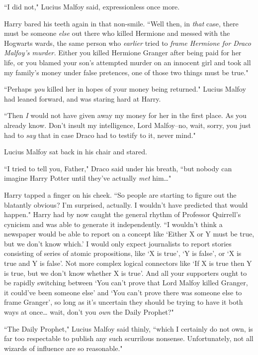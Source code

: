 ``I did not," Lucius Malfoy said, expressionless once more.

Harry bared his teeth again in that non-smile. ``Well then, in \emph{that} case, there must be someone \emph{else} out there who killed Hermione and messed with the Hogwarts wards, the same person who \emph{earlier} tried to \emph{frame Hermione for Draco Malfoy's murder.} Either you killed Hermione Granger after being paid for her life, or you blamed your son's attempted murder on an innocent girl and took all my family's money under false pretences, one of those two things must be true."

``Perhaps \emph{you} killed her in hopes of your money being returned." Lucius Malfoy had leaned forward, and was staring hard at Harry.

``Then \emph{I} would not have given away my money for her in the first place. As you already know. Don't insult my intelligence, Lord Malfoy\---no, wait, sorry, you just had to \emph{say} that in case Draco had to testify to it, never mind."

Lucius Malfoy sat back in his chair and stared.

``I tried to tell you, Father," Draco said under his breath, ``but nobody can imagine Harry Potter until they've actually \emph{met} him{\ldots}"

Harry tapped a finger on his cheek. ``So people are starting to figure out the blatantly obvious? I'm surprised, actually. I wouldn't have predicted that would happen." Harry had by now caught the general rhythm of Professor Quirrell's cynicism and was able to generate it independently. ``I wouldn't think a newspaper would be able to report on a concept like `Either X or Y must be true, but we don't know which.' I would only expect journalists to report stories consisting of series of atomic propositions, like `X is true', `Y is false', or `X is true and Y is false'. Not more complex logical connectors like `If X is true then Y is true, but we don't know whether X is true'. And all your supporters ought to be rapidly switching between `You can't prove that Lord Malfoy killed Granger, it could've been someone else' and `You can't prove there was someone else to frame Granger', so long as it's uncertain they should be trying to have it both ways at once{\ldots} wait, don't you \emph{own} the Daily Prophet?"

``The Daily Prophet," Lucius Malfoy said thinly, ``which I certainly do not own, is far too respectable to publish any such scurrilous nonsense. Unfortunately, not all wizards of influence are so reasonable."

